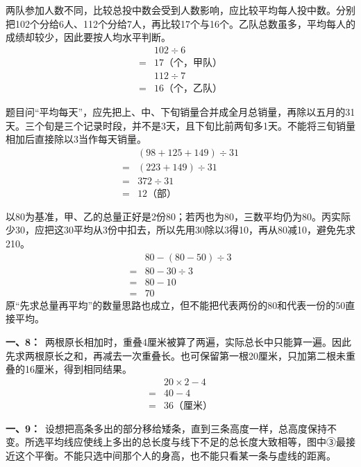 \documentclass[multi=snippet,border=0pt]{standalone}
\newenvironment{snippet}[3]{\begin{minipage}{#1bp}\color{answerred}\fontsize{#2}{#3}\selectfont\raggedright}{\end{minipage}}
\begin{document}
\begin{snippet}{505}{11.5}{14}两队参加人数不同，比较总投中数会受到人数影响，应比较平均每人投中数。分别把102个分给6人、112个分给7人，再比较17个与16个。乙队总数虽多，平均每人的成绩却较少，因此要按人均水平判断。\[\begin{aligned}&102\div6\\={}&17\text{（个，甲队）}\\&112\div7\\={}&16\text{（个，乙队）}\end{aligned}\]\end{snippet}
\begin{snippet}{505}{11.5}{14}题目问“平均每天”，应先把上、中、下旬销量合并成全月总销量，再除以五月的31天。三个旬是三个记录时段，并不是3天，且下旬比前两旬多1天。不能将三旬销量相加后直接除以3当作每天销量。\[\begin{aligned}&(98+125+149)\div31\\={}&(223+149)\div31\\={}&372\div31\\={}&12\text{（部）}\end{aligned}\]\end{snippet}
\begin{snippet}{505}{11.5}{14}以80为基准，甲、乙的总量正好是2份80；若丙也为80，三数平均仍为80。丙实际少30，应把这30平均从3份中扣去，所以先用30除以3得10，再从80减10，避免先求210。\[\begin{aligned}&80-(80-50)\div3\\={}&80-30\div3\\={}&80-10\\={}&70\end{aligned}\]原“先求总量再平均”的数量思路也成立，但不能把代表两份的80和代表一份的50直接平均。\end{snippet}
\begin{snippet}{505}{11.5}{14}\textbf{一、8：}\ 两根原长相加时，重叠4厘米被算了两遍，实际总长中只能算一遍。因此先求两根原长之和，再减去一次重叠长。也可保留第一根20厘米，只加第二根未重叠的16厘米，得到相同结果。\[\begin{aligned}&20\times2-4\\={}&40-4\\={}&36\text{（厘米）}\end{aligned}\]\end{snippet}
\begin{snippet}{505}{11.5}{14}\textbf{一、9：}\ 设想把高条多出的部分移给矮条，直到三条高度一样，总高度保持不变。所选平均线应使线上多出的总长度与线下不足的总长度大致相等，图中③最接近这个平衡。不能只选中间那个人的身高，也不能只看某一条与虚线的距离。\end{snippet}
\end{document}
